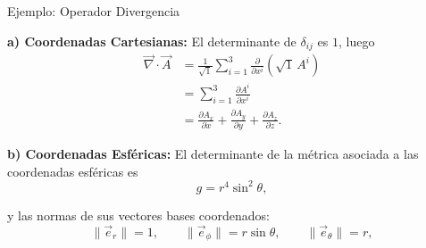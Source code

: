 \documentclass[../apunte_mecanica_clasica.tex]{subfiles}%
\begin{document}
\begin{apuntebloque}{Ejemplo: Operador Divergencia}

\textbf{a) Coordenadas Cartesianas:}  
El determinante de $\delta_{ij}$ es $1$, luego
\begin{align*}
    \vec{\nabla}\cdot \vec{A} 
    &= \frac{1}{\sqrt{1}} \sum_{i=1}^3 
       \frac{\partial}{\partial x^i} \left( \sqrt{1}\, A^i \right) \\[6pt]
    &= \sum_{i=1}^3 \frac{\partial A^i}{\partial x^i} \\[6pt]
    &= \frac{\partial A_x}{\partial x}
     + \frac{\partial A_y}{\partial y}
     + \frac{\partial A_z}{\partial z}.
\end{align*}

\vspace{0.5cm}

\textbf{b) Coordenadas Esféricas:}  
El determinante de la métrica asociada a las coordenadas esféricas es
\begin{equation*}
    g = r^4 \sin^2 \theta,
\end{equation*}
    
y las normas de sus vectores bases coordenados:
\[
    \|\vec{e}_r\| = 1, \qquad 
    \|\vec{e}_\phi\| = r \sin \theta, \qquad 
    \|\vec{e}_\theta\| = r,
\]


\end{apuntebloque}
\end{document}

